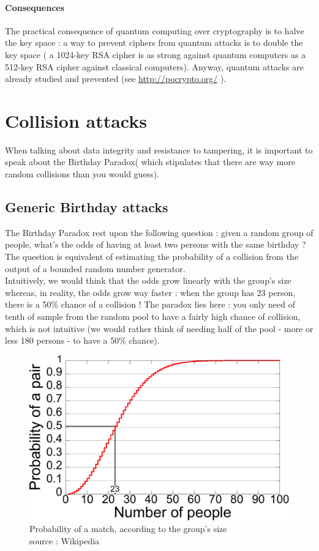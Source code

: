 \paragraph{ Consequences } 
The practical consequence of quantum computing over cryptography is to halve the key space : a way to prevent ciphers from quantum attacks is to double the key space ( a 1024-key RSA cipher is as strong against quantum computers as a 512-key RSA cipher against classical computers). Anyway, quantum attacks are already studied and prevented (see \url{http://pqcrypto.org/} ).


\section{Collision attacks}

When talking about data integrity and resistance to tampering, it is important to speak about the Birthday Paradox( which stipulates that there are way more random collisions than you would guess).

\subsection{Generic Birthday attacks}

The Birthday Paradox rest upon the following question : given a random group of people, what's the odds of having at least two persons with the same birthday ? The question is equivalent of estimating the probability of a collision from the output of a bounded random number generator.\\

Intuitively, we would think that the odds grow linearly with the group's size whereas, in reality, the odds grow way faster : when the group has 23 person, there is a 50\% chance of a collision ! The paradox lies here : you only need of tenth of sample from the random pool to have a fairly high chance of collision, which is not intuitive (we would rather think of needing half of the pool - more or less 180 persons -  to have a 50\% chance).

\begin{figure}[ht!]
    \centering
   	\includegraphics[width=\textwidth]{images/Birthday_Paradox.pdf}
	\caption{Probability of a match, according to the group's size \\ source : Wikipedia}
	\label{fig:BirthdayParadox}
\end{figure}

